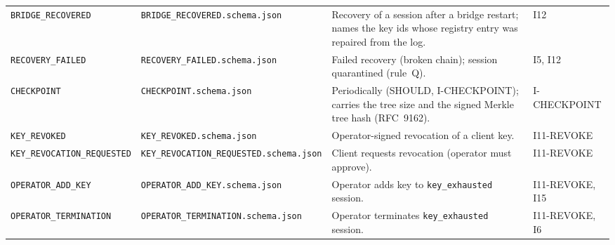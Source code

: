 \begin{table}[htbp]
\begin{tabularx}{\columnwidth}{l l X l}
\texttt{BRIDGE\_RECOVERED} & \texttt{BRIDGE\_RECOVERED.schema.json} & Recovery of a session after a bridge restart; names the key ids whose registry entry was repaired from the log. & I12 \\
\texttt{RECOVERY\_FAILED} & \texttt{RECOVERY\_FAILED.schema.json} & Failed recovery (broken chain); session quarantined (rule~Q). & I5, I12 \\
\texttt{CHECKPOINT} & \texttt{CHECKPOINT.schema.json} & Periodically (SHOULD, I-CHECKPOINT); carries the tree size and the signed Merkle tree hash (RFC~9162). & I-CHECKPOINT \\
\texttt{KEY\_REVOKED} & \texttt{KEY\_REVOKED.schema.json} & Operator-signed revocation of a client key. & I11-REVOKE \\
\texttt{KEY\_REVOCATION\_REQUESTED} & \texttt{KEY\_REVOCATION\_REQUESTED.schema.json} & Client requests revocation (operator must approve). & I11-REVOKE \\
\texttt{OPERATOR\_ADD\_KEY} & \texttt{OPERATOR\_ADD\_KEY.schema.json} & Operator adds key to \texttt{key\_exhausted} session. & I11-REVOKE, I15 \\
\texttt{OPERATOR\_TERMINATION} & \texttt{OPERATOR\_TERMINATION.schema.json} & Operator terminates \texttt{key\_exhausted} session. & I11-REVOKE, I6 \\
\bottomrule
\end{tabularx}
\end{table}

